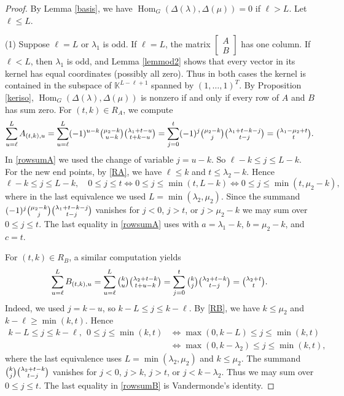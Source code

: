 \documentclass[11pt]{amsart}
\theoremstyle{remark}
\theoremstyle{definition}
\newcommand{\Hom}{\operatorname{Hom}}
\newcommand{\la}{\lambda}
\newcommand{\K}{\mathbb K}
\numberwithin{equation}{section}
\begin{document}
\begin{proof}
	By Lemma \ref{basis}, 	we have $\Hom_G(\Delta(\la),\Delta(\mu)) = 0$
	if $\ell>L$. Let $\ell\le L$.
	
	(1) Suppose $\ell=L$ or $\la_1$ is odd.
	If $\ell=L$, the matrix
	$\left[\begin{smallmatrix}A\\B\end{smallmatrix}\right]$
	has one column. If $\ell<L$, then $\la_1$ is odd, and
	Lemma \ref{lemmod2} shows that every vector in its kernel
	has equal coordinates (possibly all zero).
	Thus in both cases the kernel is
	contained in the subspace of  $\K^{L-\ell+1}$ spanned by
	$(1,\ldots,1)^T$.
	By Proposition \ref{keriso}, $\Hom_G(\Delta(\la),\Delta(\mu))$ is
	nonzero if and only if every row of $A$ and
	$B$ has sum zero. For $(t,k)\in R_A$, we compute
	\begin{equation}\label{rowsumA}
		\sum_{u=\ell}^{L}A_{(t,k),u}
		=\sum_{u=\ell}^{L}(-1)^{u-k}
		\tbinom{\mu_2-k}{u-k}
		\tbinom{\la_1+t-u}{t+k-u}=\sum_{j=0}^{t}(-1)^j
		\tbinom{\mu_2-k}{j}
		\tbinom{\la_1+t-k-j}{t-j}
		=\tbinom{\la_1-\mu_2+t}{t}.
	\end{equation}
	In \eqref{rowsumA} we used the change of variable $j=u-k$. So 
	$\ell-k\le j\le L-k$. For the new end points, by \eqref{RA}, we have $\ell\le k$ and
	$t\le\la_2-k$. Hence 
	\[
	\ell-k\le j\le L-k,\quad 0\le j\le t
	\iff 0\le j\le\min(t,L-k)
	\iff 0\le j\le\min(t,\mu_2-k),
	\] where in the last equivalence we used $L=\min(\lambda_2,\mu_2)$.
	Since the summand $(-1)^j
	\tbinom{\mu_2-k}{j}
	\tbinom{\la_1+t-k-j}{t-j}$ vanishes for $j<0$, $j>t$, or $j>\mu_2-k$ we may sum over $0\le j\le t$. The last equality in \eqref{rowsumA} uses
	\cite[Lemma 4.1(2)]{MS} with
	$a=\la_1-k$, $b=\mu_2-k$, and $c=t$.
	
	For $(t,k)\in R_B$, a similar computation yields
	\begin{equation}\label{rowsumB}
			\sum_{u=\ell}^{L}B_{(t,k),u}
			=\sum_{u=\ell}^{L}
			\tbinom{k}{u}
			\tbinom{\la_2+t-k}{t+u-k}=\sum_{j=0}^{t}
			\tbinom{k}{j}
			\tbinom{\la_2+t-k}{t-j}=\tbinom{\la_2+t}{t}.
	\end{equation}
Indeed, we used $j=k-u$, so
$k-L\le j\le k-\ell$.
By \eqref{RB}, we have $k\le\mu_2$ and
$k-\ell\ge\min(k,t)$.
Hence
\[
\begin{aligned}
	k-L\le j\le k-\ell,\ \ 
	0\le j\le\min(k,t)&\iff
	\max(0,k-L)\le j\le\min(k,t)\\
	&\iff
	\max(0,k-\la_2)\le j\le\min(k,t),
\end{aligned}
\]
where the last equivalence uses
$L=\min(\la_2,\mu_2)$ and $k\le\mu_2$.
The summand 	$\tbinom{k}{j}
\tbinom{\la_2+t-k}{t-j}$ vanishes for $j<0$, $j>k$,
$j>t$, or $j<k-\la_2$.
Thus we may sum over $0\le j\le t$.
The last equality in \eqref{rowsumB}
is Vandermonde's identity.
	

\end{proof}
\end{document}

